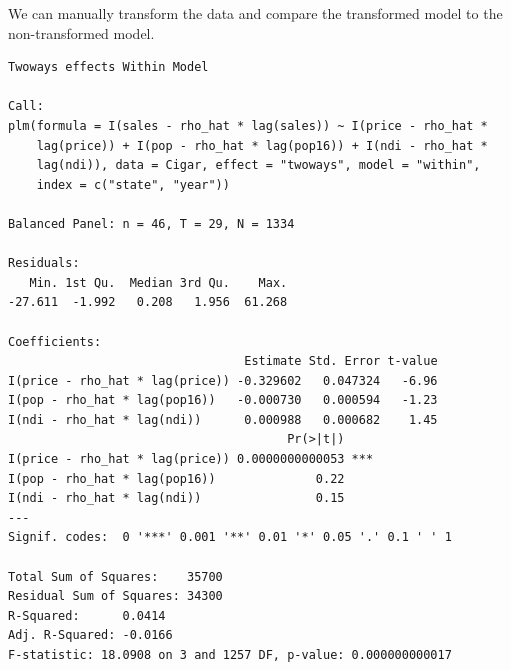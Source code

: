 \documentclass[]{book}
\newenvironment{Shaded}{\begin{snugshade}}{\end{snugshade}}
\newcommand{\CommentTok}[1]{\textcolor[rgb]{0.56,0.35,0.01}{\textit{#1}}}
\newcommand{\DataTypeTok}[1]{\textcolor[rgb]{0.13,0.29,0.53}{#1}}
\newcommand{\DecValTok}[1]{\textcolor[rgb]{0.00,0.00,0.81}{#1}}
\newcommand{\KeywordTok}[1]{\textcolor[rgb]{0.13,0.29,0.53}{\textbf{#1}}}
\newcommand{\NormalTok}[1]{#1}
\newcommand{\OperatorTok}[1]{\textcolor[rgb]{0.81,0.36,0.00}{\textbf{#1}}}
\newcommand{\StringTok}[1]{\textcolor[rgb]{0.31,0.60,0.02}{#1}}
\begin{document}
We can manually transform the data and compare the transformed model to the non-transformed model.

\begin{Shaded}
\end{Shaded}

\begin{verbatim}
Twoways effects Within Model

Call:
plm(formula = I(sales - rho_hat * lag(sales)) ~ I(price - rho_hat * 
    lag(price)) + I(pop - rho_hat * lag(pop16)) + I(ndi - rho_hat * 
    lag(ndi)), data = Cigar, effect = "twoways", model = "within", 
    index = c("state", "year"))

Balanced Panel: n = 46, T = 29, N = 1334

Residuals:
   Min. 1st Qu.  Median 3rd Qu.    Max. 
-27.611  -1.992   0.208   1.956  61.268 

Coefficients:
                                 Estimate Std. Error t-value
I(price - rho_hat * lag(price)) -0.329602   0.047324   -6.96
I(pop - rho_hat * lag(pop16))   -0.000730   0.000594   -1.23
I(ndi - rho_hat * lag(ndi))      0.000988   0.000682    1.45
                                       Pr(>|t|)    
I(price - rho_hat * lag(price)) 0.0000000000053 ***
I(pop - rho_hat * lag(pop16))              0.22    
I(ndi - rho_hat * lag(ndi))                0.15    
---
Signif. codes:  0 '***' 0.001 '**' 0.01 '*' 0.05 '.' 0.1 ' ' 1

Total Sum of Squares:    35700
Residual Sum of Squares: 34300
R-Squared:      0.0414
Adj. R-Squared: -0.0166
F-statistic: 18.0908 on 3 and 1257 DF, p-value: 0.000000000017
\end{verbatim}
\end{document}
